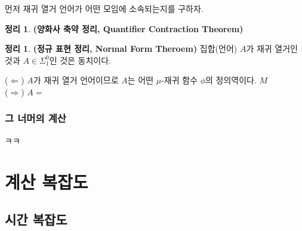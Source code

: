 \documentclass[b5paper, 11pt]{book}
\theoremstyle{definition}
\newtheorem{thm}[defn]{정리}
\newenvironment{pf*}{\pushQED{\qed}\pf}
{\popQED\endpf}
\begin{document}
먼저 재귀 열거 언어가 어떤 모임에 소속되는지를 구하자. 
\begin{thm}
    \textbf{(양화사 축약 정리, Quantifier Contraction Theorem)}
    
\end{thm}
\begin{thm}
    \textbf{(정규 표현 정리, Normal Form Theroem)} 집합(언어) $A$가 재귀 열거인 것과
    $A \in \Sigma_1^0$인 것은 동치이다. 
\end{thm}
\begin{pf*}
    ($\Leftarrow$) $A$가 재귀 열거 언어이므로 $A$는 어떤 $\mu$-재귀 함수 $\phi$의
    정의역이다. $M$ \\
    ($\Rightarrow$) $A = $
\end{pf*}
\section{그 너머의 계산}
ㅋㅋ
\part{계산 복잡도}
\chapter{시간 복잡도}
\end{document}
